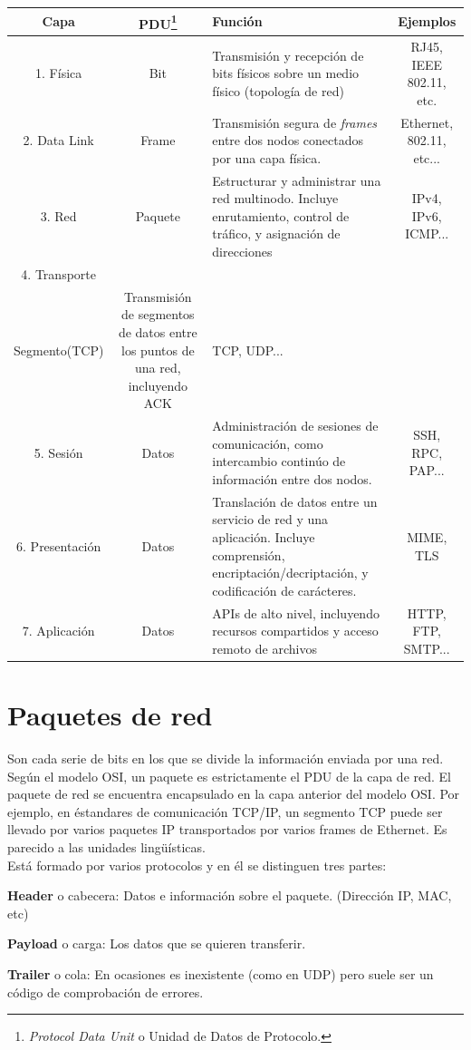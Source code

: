 \documentclass[a4paper, 11pt]{report} %
\begin{document}
\renewcommand{\arraystretch}{1} %
\noindent\linespread{1}
\begin{tabularx}{\linewidth}{ | c >{\small}c >{\small}X >{\small}c | }
	\rowcolor{header} \hline
	\textbf{Capa} & \textbf{PDU\footnote{\textit{Protocol Data Unit} o Unidad de Datos de Protocolo.}} & \textbf{Función} & \textbf{Ejemplos} \\ \hline
	1. Física & Bit & Transmisión y recepción de bits físicos sobre un medio físico (topología de red) & 	 RJ45, IEEE 802.11, etc. \\
	\label{osi}
	2. Data Link & Frame & Transmisión segura de \textit{frames} entre dos nodos conectados por una capa física. & Ethernet, 802.11, etc...\\
	3. Red & Paquete & Estructurar y administrar una red multinodo. Incluye enrutamiento, control de tráfico, y asignación de direcciones & IPv4, IPv6, ICMP... \\
	4. Transporte & \begin{tabular}[t]{@{}c@{}}Datagrama(UDP)\\Segmento(TCP)  \end{tabular} &
	Transmisión de segmentos de datos entre los puntos de una red, incluyendo ACK & TCP, UDP...\\
	5. Sesión & Datos & Administración de sesiones de comunicación, como intercambio continúo de información entre dos nodos. & SSH, RPC, PAP...\\ 
	6. Presentación & Datos & Translación de datos entre un servicio de red y una aplicación. Incluye comprensión, encriptación/decriptación, y codificación de carácteres. & MIME, TLS \\
	7. Aplicación & Datos & APIs de alto nivel, incluyendo recursos compartidos y acceso remoto de archivos & HTTP, FTP, SMTP... \\ \hline
\end{tabularx}
\newpage

\section{Paquetes de red}
Son cada serie de bits en los que se divide la información enviada por una red. \\ Según el modelo OSI, un paquete es estrictamente el PDU de la capa de red. El paquete de red se encuentra encapsulado en la capa anterior del modelo OSI. Por ejemplo, en éstandares de comunicación TCP/IP, un segmento TCP puede ser llevado por varios paquetes IP transportados por varios frames de Ethernet. Es parecido a las unidades lingüísticas. \\Está formado por varios protocolos y en él se distinguen tres partes:
\begin{description}
\item \textbf{Header} o cabecera: Datos e información sobre el paquete. (Dirección IP, MAC, etc)
\item \textbf{Payload} o carga: Los datos que se quieren transferir.
\item \textbf{Trailer} o cola: En ocasiones es inexistente (como en UDP) pero suele ser un código de comprobación de errores.
\end{description}
\end{document}
